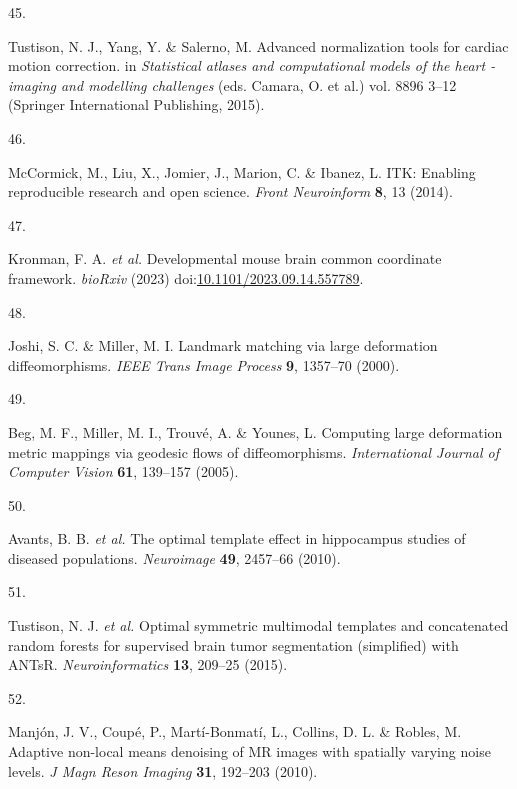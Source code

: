 \documentclass[
  12pt,
]{article}
\newlength{\cslhangindent}
\newlength{\csllabelwidth}
\newenvironment{CSLReferences}[2] %
 {%
  \setlength{\parindent}{0pt}
  \ifodd #1 \everypar{\setlength{\hangindent}{\cslhangindent}}\ignorespaces\fi
  \ifnum #2 > 0
  \setlength{\parskip}{#2\baselineskip}
  \fi
 }%
 {}
\newcommand{\CSLLeftMargin}[1]{\parbox[t]{\csllabelwidth}{#1}}
\newcommand{\CSLRightInline}[1]{\parbox[t]{\linewidth - \csllabelwidth}{#1}\break}
\begin{document}
\begin{CSLReferences}{0}{0}
\leavevmode{}%
\CSLLeftMargin{45. }
\CSLRightInline{Tustison, N. J., Yang, Y. \& Salerno, M. Advanced
normalization tools for cardiac motion correction. in \emph{Statistical
atlases and computational models of the heart - imaging and modelling
challenges} (eds. Camara, O. et al.) vol. 8896 3--12 (Springer
International Publishing, 2015).}

\leavevmode{}%
\CSLLeftMargin{46. }
\CSLRightInline{McCormick, M., Liu, X., Jomier, J., Marion, C. \&
Ibanez, L. ITK: Enabling reproducible research and open science.
\emph{Front Neuroinform} \textbf{8}, 13 (2014).}

\leavevmode{}%
\CSLLeftMargin{47. }
\CSLRightInline{Kronman, F. A. \emph{et al.} Developmental mouse brain
common coordinate framework. \emph{bioRxiv} (2023)
doi:\href{https://doi.org/10.1101/2023.09.14.557789}{10.1101/2023.09.14.557789}.}

\leavevmode{}%
\CSLLeftMargin{48. }
\CSLRightInline{Joshi, S. C. \& Miller, M. I. Landmark matching via
large deformation diffeomorphisms. \emph{IEEE Trans Image Process}
\textbf{9}, 1357--70 (2000).}

\leavevmode{}%
\CSLLeftMargin{49. }
\CSLRightInline{Beg, M. F., Miller, M. I., Trouvé, A. \& Younes, L.
Computing large deformation metric mappings via geodesic flows of
diffeomorphisms. \emph{International Journal of Computer Vision}
\textbf{61}, 139--157 (2005).}

\leavevmode{}%
\CSLLeftMargin{50. }
\CSLRightInline{Avants, B. B. \emph{et al.} The optimal template effect
in hippocampus studies of diseased populations. \emph{Neuroimage}
\textbf{49}, 2457--66 (2010).}

\leavevmode{}%
\CSLLeftMargin{51. }
\CSLRightInline{Tustison, N. J. \emph{et al.} Optimal symmetric
multimodal templates and concatenated random forests for supervised
brain tumor segmentation (simplified) with ANTsR.
\emph{Neuroinformatics} \textbf{13}, 209--25 (2015).}

\leavevmode{}%
\CSLLeftMargin{52. }
\CSLRightInline{Manjón, J. V., Coupé, P., Martí-Bonmatí, L., Collins, D.
L. \& Robles, M. Adaptive non-local means denoising of {MR} images with
spatially varying noise levels. \emph{J Magn Reson Imaging} \textbf{31},
192--203 (2010).}


\end{CSLReferences}
\end{document}
